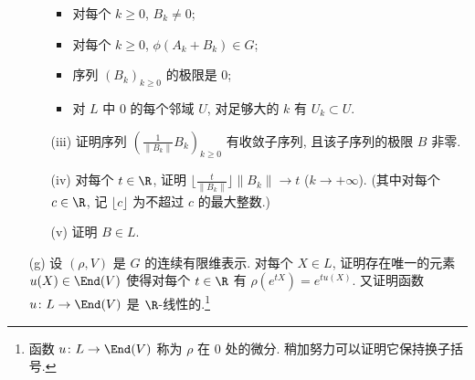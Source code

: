 \begin{exercise}
\begin{enumerate}
\begin{enumerate}
\begin{itemize}
  \item 对每个 $k \geq 0$, $B_k \neq 0$;
  \item 对每个 $k \geq 0$, $\phi(A_k + B_k) \in G$;
  \item 序列 $(B_k)_{k \geq 0}$ 的极限是 $0$;
  \item 对 $L$ 中 $0$ 的每个邻域 $U$, 对足够大的 $k$ 有 $U_k \subset U$.
  \end{itemize}
  \item[(iii)] 证明序列 $(\frac{1}{\|B_k\|}B_k)_{k \geq 0}$ 有收敛子序列, 且该子序列的极限 $B$ 非零.
  \item[(iv)] 对每个 $t \in \R$, 证明 $\lfloor\frac{t}{\|B_k\|}\rfloor\|B_k\| \to t$ ($k \to +\infty$). (其中对每个 $c \in \R$, 记 $\lfloor c \rfloor$ 为不超过 $c$ 的最大整数.)
  \item[(v)] 证明 $B \in L$.
  \end{enumerate}
\item[(g)] 设 $(\rho, V)$ 是 $G$ 的连续有限维表示. 对每个 $X \in L$, 证明存在唯一的元素 $u(X) \in \End(V)$ 使得对每个 $t \in \R$ 有 $\rho(e^{tX}) = e^{tu(X)}$. 又证明函数 $u \colon L \to \End(V)$ 是 $\R$-线性的.\footnote{函数 $u \colon L \to \End(V)$ 称为 $\rho$ 在 $0$ 处的微分. 稍加努力可以证明它保持换子括号.}
\end{enumerate}
\end{exercise}


